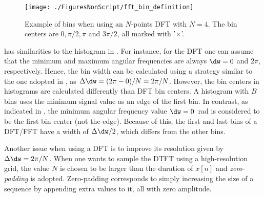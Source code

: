 \begin{figure}[htbp]
\centering
\texttt{[image: ./FiguresNonScript/fft\_bin\_definition]}
\caption{Example of bins when using an $N$-points DFT with $N=4$. The bin centers are $0, \pi/2, \pi$ and $3\pi/2$, all marked with '$\times$'.\label{fig:fft_bin_definition}}
\end{figure}

 has similarities to the histogram in .
For instance, for the DFT one can assume that the minimum and maximum angular frequencies
are always $\dw=0$ and $2 \pi$, respectively. Hence, the bin width can be calculated 
using a strategy similar to the one adopted in , 
as $\Delta \dw = (2\pi - 0)/N = 2\pi/N$. However, the bin centers in histograms
are calculated differently than DFT bin centers.
A histogram with $B$ bins uses the minimum signal value
as an edge of the first bin. In contrast, as indicated in , the minimum angular frequency
value $\dw = 0$~rad is considered to be the first bin center (not the edge). Because of
this, the first and last bins of a DFT/FFT have a width of $\Delta \dw / 2$, which differs
from the other bins.

Another issue when using a DFT is to improve its resolution given by $\Delta \dw = 2\pi / N$.
When one wants to sample the DTFT using a high-resolution grid, the value $N$ is chosen to be larger than the duration of $x[n]$
and \emph{zero-padding} is adopted.
Zero-padding corresponds to simply increasing the size of a sequence by appending extra values to it, all with zero amplitude.






